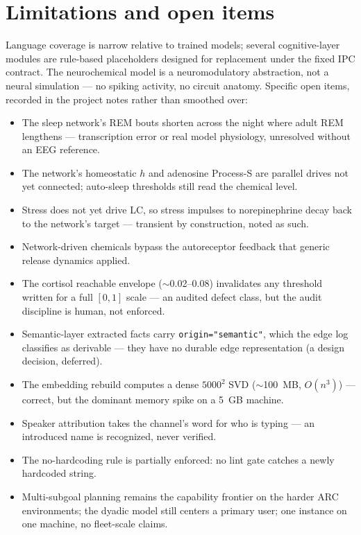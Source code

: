 \documentclass[11pt]{article}
\newcommand{\code}[1]{\texttt{\small #1}}
\begin{document}
\section{Limitations and open items}

Language coverage is narrow relative to trained models; several
cognitive-layer modules are rule-based placeholders designed for
replacement under the fixed IPC contract. The neurochemical model is a
neuromodulatory abstraction, not a neural simulation --- no spiking
activity, no circuit anatomy. Specific open items, recorded in the
project notes rather than smoothed over:

\begin{itemize}
  \item The sleep network's REM bouts shorten across the night where
    adult REM lengthens --- transcription error or real model
    physiology, unresolved without an EEG reference.
  \item The network's homeostatic $h$ and adenosine Process-S are
    parallel drives not yet connected; auto-sleep thresholds still read
    the chemical level.
  \item Stress does not yet drive LC, so stress impulses to
    norepinephrine decay back to the network's target --- transient by
    construction, noted as such.
  \item Network-driven chemicals bypass the autoreceptor feedback that
    generic release dynamics applied.
  \item The cortisol reachable envelope ($\sim$0.02--0.08) invalidates
    any threshold written for a full $[0,1]$ scale --- an audited
    defect class, but the audit discipline is human, not enforced.
  \item Semantic-layer extracted facts carry \code{origin="semantic"},
    which the edge log classifies as derivable --- they have no durable
    edge representation (a design decision, deferred).
  \item The embedding rebuild computes a dense $5000^2$ SVD
    ($\sim$100~MB, $O(n^3)$) --- correct, but the dominant memory spike
    on a 5~GB machine.
  \item Speaker attribution takes the channel's word for who is
    typing --- an introduced name is recognized, never verified.
  \item The no-hardcoding rule is partially enforced: no lint gate
    catches a newly hardcoded string.
  \item Multi-subgoal planning remains the capability frontier on the
    harder ARC environments; the dyadic model still centers a primary
    user; one instance on one machine, no fleet-scale claims.
\end{itemize}
\end{document}
